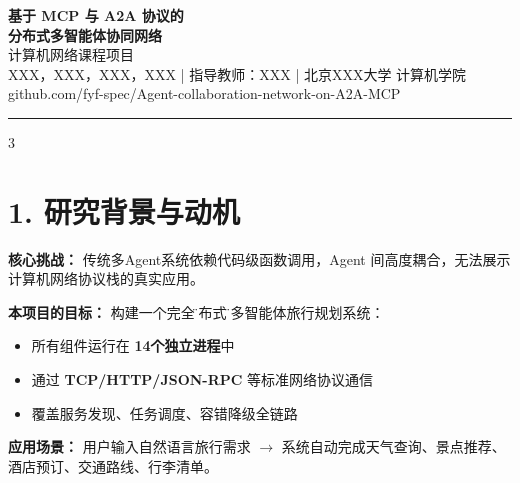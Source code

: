 \documentclass[final]{beamer}
\begin{document}
\begin{frame}[t]
\begin{center}
\vspace{1cm}
{\fontsize{52}{62}\selectfont \textbf{\color{mainblue} 基于 MCP 与 A2A 协议的}}\\[0.3cm]
{\fontsize{52}{62}\selectfont \textbf{\color{mainblue} 分布式多智能体协同网络}}\\[0.8cm]
{\Large 计算机网络课程项目}\\[0.6cm]
{\large XXX，XXX，XXX，XXX \quad | \quad 指导教师：XXX \quad | \quad 北京XXX大学 计算机学院}\\[0.3cm]
{\small \faGithub \quad github.com/fyf-spec/Agent-collaboration-network-on-A2A-MCP}
\end{center}

\vspace{0.3cm}
\hrule
\vspace{0.8cm}

\begin{multicols}{3}


\section*{\color{mainblue}1. 研究背景与动机}

\textbf{核心挑战：} 传统多Agent系统依赖代码级函数调用，Agent 间高度耦合，无法展示计算机网络协议栈的真实应用。

\textbf{本项目的目标：} 构建一个完全\"分布式\"的多智能体旅行规划系统：
\begin{itemize}[leftmargin=*]
    \item 所有组件运行在 \textbf{14个独立进程}中
    \item 通过 \textbf{TCP/HTTP/JSON-RPC} 等标准网络协议通信
    \item 覆盖服务发现、任务调度、容错降级全链路
\end{itemize}

\textbf{应用场景：} 用户输入自然语言旅行需求 $\to$ 系统自动完成天气查询、景点推荐、酒店预订、交通路线、行李清单。

\vspace{0.5cm}

\end{multicols}
\end{frame}
\end{document}
